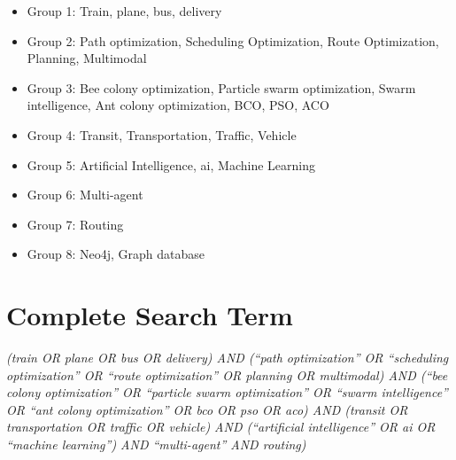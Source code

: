 \begin{itemize}

\item Group 1: Train, plane, bus, delivery
\item Group 2: Path optimization, Scheduling Optimization, Route Optimization, Planning, Multimodal
\item Group 3: Bee colony optimization, Particle swarm optimization, Swarm intelligence, Ant colony optimization, BCO, PSO, ACO
\item Group 4: Transit, Transportation, Traffic, Vehicle
\item Group 5: Artificial Intelligence, ai, Machine Learning
\item Group 6: Multi-agent
\item Group 7: Routing
\item Group 8: Neo4j, Graph database

\end{itemize}

\section{Complete Search Term}
\label{searchterm}

\textit{(train OR plane OR bus OR delivery) AND (``path optimization'' OR ``scheduling optimization'' OR ``route optimization'' OR planning OR multimodal) AND (``bee colony optimization'' OR ``particle swarm optimization'' OR ``swarm intelligence'' OR ``ant colony optimization'' OR bco OR pso OR aco) AND (transit OR transportation OR traffic OR vehicle) AND (``artificial intelligence'' OR ai OR ``machine learning'') AND ``multi-agent'' AND routing)}




